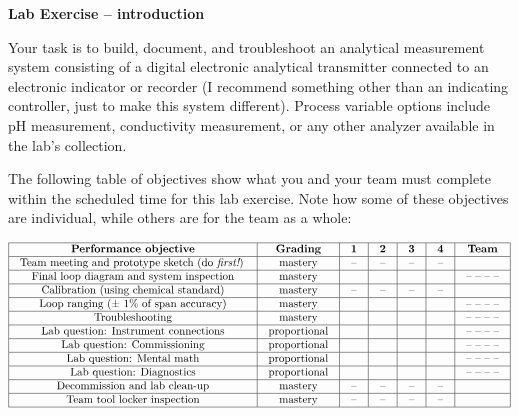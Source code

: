 

\noindent

\vskip 5pt

{\bf Lab Exercise -- introduction}

\vskip 5pt

Your task is to build, document, and troubleshoot an analytical measurement system consisting of a digital electronic analytical transmitter connected to an electronic indicator or recorder (I recommend something other than an indicating controller, just to make this system different).  Process variable options include pH measurement, conductivity measurement, or any other analyzer available in the lab's collection.  

The following table of objectives show what you and your team must complete within the scheduled time for this lab exercise.  Note how some of these objectives are individual, while others are for the team as a whole:



$$\vbox{\offinterlineskip
\halign{\strut
\vrule \quad\hfil # \ \hfil & 
\vrule \quad\hfil # \ \hfil & 
\vrule \quad\hfil # \ \hfil & 
\vrule \quad\hfil # \ \hfil & 
\vrule \quad\hfil # \ \hfil & 
\vrule \quad\hfil # \ \hfil & 
\vrule \quad\hfil # \ \hfil \vrule \cr
\noalign{\hrule}
%
{\bf Performance objective} & {\bf Grading} & {\bf 1} & {\bf 2} & {\bf 3} & {\bf 4} & {\bf Team} \cr
%
\noalign{\hrule}
%
Team meeting and prototype sketch (do {\it first!}) & mastery & -- & -- & -- & -- & \cr
%
\noalign{\hrule}
%
Final loop diagram and system inspection & mastery & & & & & -- -- -- -- \cr
%
\noalign{\hrule}
%
Calibration (using chemical standard) & mastery & -- & -- & -- & -- &  \cr
%
\noalign{\hrule}
%
Loop ranging ($\pm$ 1\% of span accuracy) & mastery & & & & & -- -- -- -- \cr
%
\noalign{\hrule}
%
Troubleshooting & mastery & & & & & -- -- -- -- \cr
%
\noalign{\hrule}
%
Lab question: Instrument connections & proportional &  &  &  &  & -- -- -- -- \cr
%
\noalign{\hrule}
%
Lab question: Commissioning & proportional &  &  &  &  & -- -- -- -- \cr
%
\noalign{\hrule}
%
Lab question: Mental math & proportional &  &  &  &  & -- -- -- -- \cr
%
\noalign{\hrule}
%
Lab question: Diagnostics & proportional &  &  &  &  & -- -- -- -- \cr
%
\noalign{\hrule}
%
Decommission and lab clean-up & mastery & -- & -- & -- & -- &  \cr
%
\noalign{\hrule}
%
Team tool locker inspection & mastery & -- & -- & -- & -- &  \cr
%
\noalign{\hrule}
} %
}$$ %

